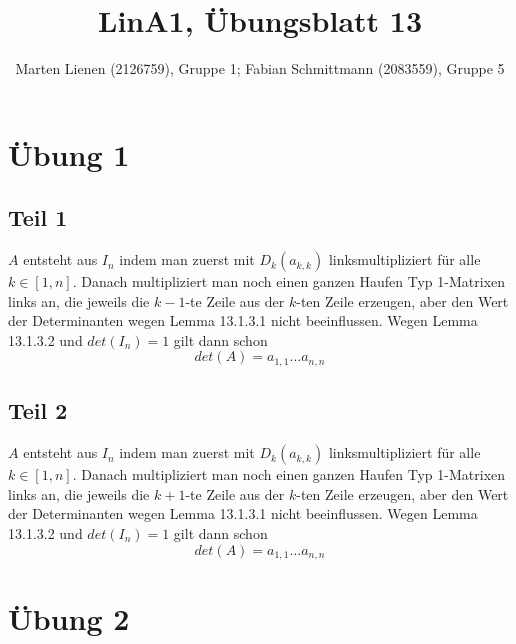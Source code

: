 \documentclass[a4paper,10pt]{article}
\title{LinA1, Übungsblatt 13}
\author{Marten Lienen (2126759), Gruppe 1; Fabian Schmittmann (2083559), Gruppe 5}
\begin{document}
\maketitle

\section*{Übung 1}

\subsection*{Teil 1}

$A$ entsteht aus $I_n$ indem man zuerst mit $D_k(a_{k,k})$ linksmultipliziert für alle $k \in [1, n]$.
Danach multipliziert man noch einen ganzen Haufen Typ 1-Matrixen links an, die jeweils die $k - 1$-te Zeile aus der $k$-ten Zeile erzeugen, aber den Wert der Determinanten wegen Lemma 13.1.3.1 nicht beeinflussen.
Wegen Lemma 13.1.3.2 und $det(I_n) = 1$ gilt dann schon
\begin{equation}
 det(A) = a_{1,1}\dots a_{n,n}
\end{equation}

\subsection*{Teil 2}

$A$ entsteht aus $I_n$ indem man zuerst mit $D_k(a_{k,k})$ linksmultipliziert für alle $k \in [1, n]$.
Danach multipliziert man noch einen ganzen Haufen Typ 1-Matrixen links an, die jeweils die $k + 1$-te Zeile aus der $k$-ten Zeile erzeugen, aber den Wert der Determinanten wegen Lemma 13.1.3.1 nicht beeinflussen.
Wegen Lemma 13.1.3.2 und $det(I_n) = 1$ gilt dann schon
\begin{equation}
 det(A) = a_{1,1}\dots a_{n,n}
\end{equation}

\section*{Übung 2}
\end{document}
